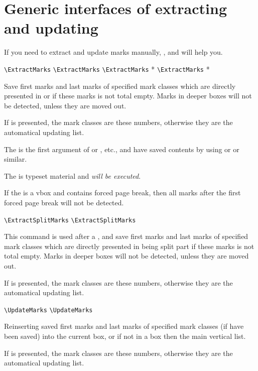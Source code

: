 \documentclass{l3doc}
\begin{document}
\section{Generic interfaces of extracting and updating}

If you need to extract and update marks manually, , 
 and  will help you.

\begin{function}{\ExtractMarks}
  \begin{syntax}
    \verb|\ExtractMarks| 
    \verb|\ExtractMarks|  
    \verb|\ExtractMarks| * 
    \verb|\ExtractMarks| *  
  \end{syntax}
Save first marks and last marks of specified mark classes
which are directly presented in  or  
if these marks is not total empty. 
Marks in deeper boxes will not be detected, unless they are moved out.

If  is presented, the mark classes are these numbers, otherwise
they are the automatical updating list.

The  is the first argument of  or , etc.,
and have saved contents by using  or  or similar.

The  is typeset material and \emph{will be executed}.

If the  is a vbox and contains forced page break, then all marks after 
the first forced page break will not be detected.
\end{function}

\begin{function}{\ExtractSplitMarks}
  \begin{syntax}
    \verb|\ExtractSplitMarks|
    \verb|\ExtractSplitMarks| 
  \end{syntax}
This command is used after a , and save 
first marks and last marks of specified mark classes which are directly
presented in being split part if these marks is not total empty. 
Marks in deeper boxes will not be detected, unless they are moved out.

If  is presented, the mark classes are these numbers, otherwise
they are the automatical updating list.
\end{function}

\begin{function}{\UpdateMarks}
  \begin{syntax}
    \verb|\UpdateMarks|
    \verb|\UpdateMarks| 
  \end{syntax}
Reinserting saved first marks and last marks of specified mark classes 
(if have been saved) into the current box, 
or if not in a box then the main vertical list.

If  is presented, the mark classes are these numbers, otherwise
they are the automatical updating list.
\end{function}
\end{document}
